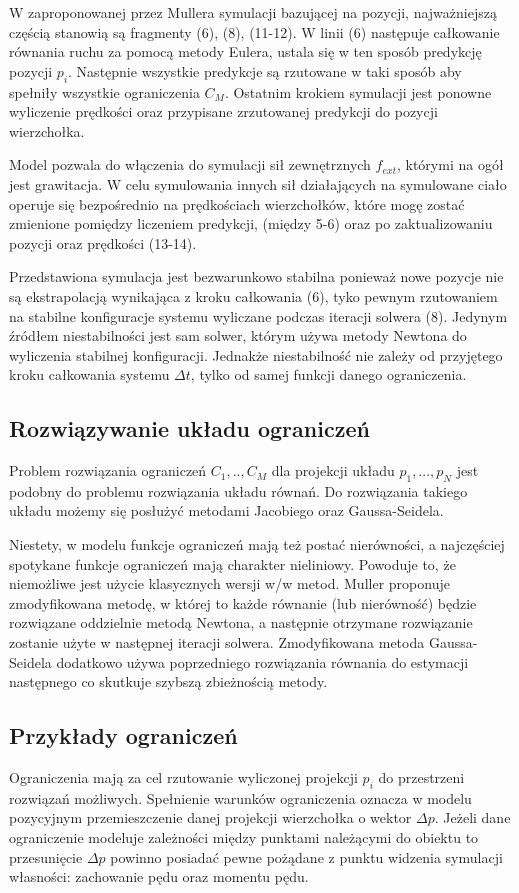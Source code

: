 W zaproponowanej przez Mullera symulacji bazującej na pozycji, najważniejszą częścią stanowią są
fragmenty (6), (8), (11-12). W linii (6) następuje całkowanie równania ruchu za 
pomocą metody Eulera, ustala się w ten sposób predykcję pozycji $p_i$. Następnie
wszystkie predykcje są rzutowane w taki sposób aby spełniły wszystkie
ograniczenia $C_M$. Ostatnim krokiem symulacji jest ponowne wyliczenie
prędkości oraz przypisane zrzutowanej predykcji do pozycji wierzchołka.

Model pozwala do włączenia do symulacji sił zewnętrznych $f_{ext}$, którymi na ogół jest
grawitacja. W celu symulowania innych sił działających na symulowane ciało
operuje się bezpośrednio na prędkościach wierzchołków, które mogę zostać
zmienione pomiędzy liczeniem predykcji, (między 5-6) oraz po
zaktualizowaniu pozycji oraz prędkości (13-14).

Przedstawiona symulacja jest bezwarunkowo stabilna ponieważ nowe pozycje nie są
ekstrapolacją wynikająca z kroku całkowania (6), tyko pewnym rzutowaniem na
stabilne konfiguracje systemu wyliczane podczas iteracji solwera (8). Jedynym
źródłem niestabilności jest sam solwer, którym używa metody Newtona do wyliczenia
stabilnej konfiguracji. Jednakże niestabilność nie zależy od przyjętego kroku
całkowania systemu $\Delta t$, tylko od samej funkcji danego
ograniczenia\cite{pbdyn}.

\subsection{Rozwiązywanie układu ograniczeń}
Problem rozwiązania ograniczeń $C_1, .., C_M$ dla projekcji układu $p_1, ..., p_N$
jest podobny do problemu rozwiązania układu równań. Do rozwiązania takiego
układu możemy się posłużyć metodami Jacobiego oraz Gaussa-Seidela. 

Niestety, w modelu funkcje ograniczeń mają też postać nierówności, a
najczęściej spotykane funkcje ograniczeń mają charakter nieliniowy. Powoduje to,
że niemożliwe jest użycie klasycznych wersji w/w metod. Muller proponuje
zmodyfikowana metodę, w której to każde równanie (lub nierówność) będzie rozwiązane
oddzielnie metodą Newtona, a następnie otrzymane rozwiązanie zostanie użyte w
następnej iteracji solwera. Zmodyfikowana metoda Gaussa-Seidela dodatkowo używa
poprzedniego rozwiązania równania do estymacji następnego co skutkuje szybszą
zbieżnością metody\cite{pbdyn}.

\subsection{Przykłady ograniczeń}
Ograniczenia mają za cel rzutowanie wyliczonej projekcji $p_i$ do przestrzeni
rozwiązań możliwych. Spełnienie warunków ograniczenia oznacza w 
modelu pozycyjnym przemieszczenie danej projekcji wierzchołka o wektor $\Delta p$.
Jeżeli dane ograniczenie modeluje zależności między punktami należącymi do
obiektu to przesunięcie $\Delta p$ powinno posiadać
pewne pożądane z punktu widzenia symulacji własności: zachowanie pędu oraz
momentu pędu.

